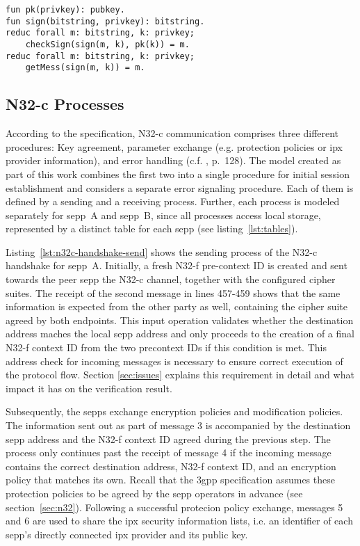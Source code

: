 \begin{lstlisting}[caption={Definition of custom constructors and destructors},label={lst:destructors},firstnumber=141]
fun pk(privkey): pubkey.
fun sign(bitstring, privkey): bitstring.
reduc forall m: bitstring, k: privkey;
    checkSign(sign(m, k), pk(k)) = m.
reduc forall m: bitstring, k: privkey;
    getMess(sign(m, k)) = m.
\end{lstlisting}

\subsection{N32-c Processes}

According to the specification, N32-c communication comprises three different procedures: Key agreement, parameter exchange (e.g. protection policies or \gls{ipx} provider information), and error handling (c.f. \cite{3gpp.33.501}, p.~128).
The model created as part of this work combines the first two into a single procedure for initial session establishment and considers a separate error signaling procedure.
Each of them is defined by a sending and a receiving process.
Further, each process is modeled separately for \gls{sepp}~A and \gls{sepp}~B, since all processes access local storage, represented by a distinct table for each \gls{sepp} (see listing~\ref{lst:tables}).

Listing~\ref{lst:n32c-handshake-send} shows the sending process of the N32-c handshake for \gls{sepp}~A.
Initially, a fresh N32-f pre-context ID is created and sent towards the peer \gls{sepp} the N32-c channel, together with the configured cipher suites.
The receipt of the second message in lines 457-459 shows that the same information is expected from the other party as well, containing the cipher suite agreed by both endpoints.
This input operation validates whether the destination address maches the local \gls{sepp} address and only proceeds to the creation of a final N32-f context ID from the two precontext IDs if this condition is met.
This address check for incoming messages is necessary to ensure correct execution of the protocol flow.
Section \ref{sec:issues} explains this requirement in detail and what impact it has on the verification result.

Subsequently, the \glspl{sepp} exchange encryption policies and modification policies.
The information sent out as part of message 3 is accompanied by the destination \gls{sepp} address and the N32-f context ID agreed during the previous step.
The process only continues past the receipt of message 4 if the incoming message contains the correct destination address, N32-f context ID, and an encryption policy that matches its own.
Recall that the \gls{3gpp} specification assumes these protection policies to be agreed by the \gls{sepp} operators in advance (see section~\ref{sec:n32}).
Following a successful protecion policy exchange, messages 5 and 6 are used to share the \gls{ipx} security information lists, i.e. an identifier of each \gls{sepp}'s directly connected \gls{ipx} provider and its public key.

